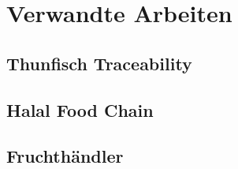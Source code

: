 \section{Verwandte Arbeiten}

\subsection{Thunfisch Traceability}

\subsection{Halal Food Chain}

\subsection{Fruchthändler}

\newpage
